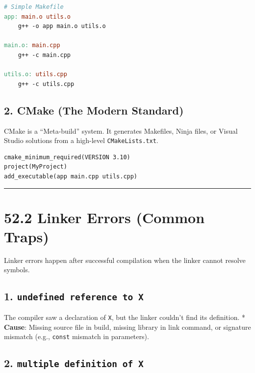 \begin{lstlisting}[language=make]
# Simple Makefile
app: main.o utils.o
    g++ -o app main.o utils.o

main.o: main.cpp
    g++ -c main.cpp

utils.o: utils.cpp
    g++ -c utils.cpp
\end{lstlisting}

\hypertarget{cmake-the-modern-standard}{%
\subsection{2. CMake (The Modern
Standard)}\label{cmake-the-modern-standard}}

CMake is a ``Meta-build'' system. It generates Makefiles, Ninja files,
or Visual Studio solutions from a high-level
\passthrough{\lstinline!CMakeLists.txt!}.

\begin{lstlisting}
cmake_minimum_required(VERSION 3.10)
project(MyProject)
add_executable(app main.cpp utils.cpp)
\end{lstlisting}

\begin{center}\rule{0.5\linewidth}{0.5pt}\end{center}

\hypertarget{linker-errors-common-traps}{%
\section{52.2 Linker Errors (Common
Traps)}\label{linker-errors-common-traps}}

Linker errors happen after successful compilation when the linker cannot
resolve symbols.

\hypertarget{undefined-reference-to-x}{%
\subsection{\texorpdfstring{1.
\texttt{undefined\ reference\ to\ \textquotesingle{}X\textquotesingle{}}}{1. undefined reference to 'X'}}\label{undefined-reference-to-x}}

The compiler saw a declaration of \passthrough{\lstinline!X!}, but the
linker couldn't find its definition. * \textbf{Cause}: Missing source
file in build, missing library in link command, or signature mismatch
(e.g., \passthrough{\lstinline!const!} mismatch in parameters).

\hypertarget{multiple-definition-of-x}{%
\subsection{\texorpdfstring{2.
\texttt{multiple\ definition\ of\ \textquotesingle{}X\textquotesingle{}}}{2. multiple definition of 'X'}}\label{multiple-definition-of-x}}

